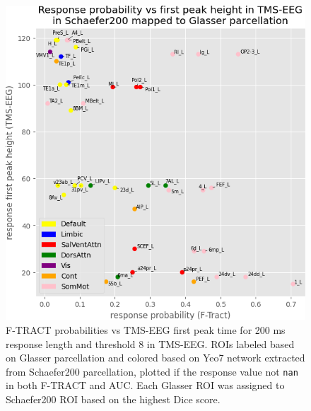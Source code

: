 \begin{figure}
  \begin{center}
    \includegraphics[width=\textwidth]{images/nootebook_generated/pytepfit_ftract_comparison_results_200ms/FP/Response_probability_vs_first_peak_height_in_TMS-EEG_in_Schaefer200_mapped_to_Glasser_parcellation.png}
  \end{center}
  \caption[F-TRACT probabilities vs TMS-EEG first peak time]{F-TRACT probabilities vs TMS-EEG first peak time for 200 ms response length and threshold 8 in TMS-EEG. ROIs labeled based on Glasser parcellation and colored based on Yeo7 network extracted from Schaefer200 parcellation, plotted if the response value not \texttt{nan} in both F-TRACT and AUC. Each Glasser ROI was assigned to Schaefer200 ROI based on the highest Dice score.}
  \label{response_tmsFP-ftract_scatter}
\end{figure}